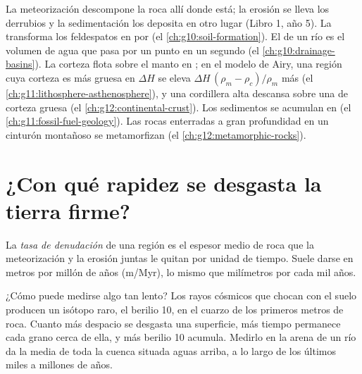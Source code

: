 \begin{recall}
La meteorización descompone la roca allí donde está; la erosión se lleva los
derrubios y la sedimentación los deposita en otro lugar (Libro 1, año 5). La
 transforma los feldespatos en 
por  (el \cref{ch:g10:soil-formation}). El  de un río es el
volumen de agua que pasa por un punto en un segundo (el
\cref{ch:g10:drainage-basins}). La corteza flota sobre el manto en ;
en el modelo de Airy, una región cuya corteza es más gruesa en $\Delta H$ se
eleva $\Delta H\,(\rho_m - \rho_c)/\rho_m$ más
(el \cref{ch:g11:lithosphere-asthenosphere}), y una cordillera alta descansa
sobre una  de corteza gruesa (el \cref{ch:g12:continental-crust}). Los
sedimentos se acumulan en  (el
\cref{ch:g11:fossil-fuel-geology}). Las rocas enterradas a gran profundidad en
un cinturón montañoso se metamorfizan (el \cref{ch:g12:metamorphic-rocks}).
\end{recall}

\section{¿Con qué rapidez se desgasta la tierra firme?}

\begin{definition}\label{def:g12:destruction-of-mountains:denudation}
La \emph{tasa de denudación} de una
región es el espesor medio de roca que la meteorización y la erosión juntas le
quitan por unidad de tiempo. Suele darse en metros por millón de años
(\unit{m/Myr}), lo mismo que milímetros por cada mil años.
\end{definition}

¿Cómo puede medirse algo tan lento? Los rayos cósmicos que chocan con el
suelo producen un isótopo raro, el berilio 10, en el cuarzo de los primeros
metros de roca. Cuanto más despacio se desgasta una superficie, más tiempo
permanece cada grano cerca de ella, y más berilio 10 acumula. Medirlo en la
arena de un río da la  media de toda la cuenca situada aguas
arriba, a lo largo de los últimos miles a millones de años.

